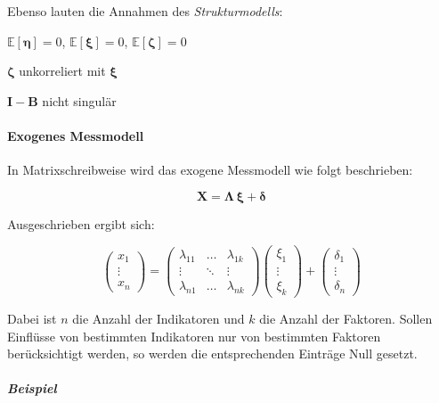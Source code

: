 \documentclass{article}
\numberwithin{equation}{section}
\begin{document}
Ebenso lauten die Annahmen des \emph{Strukturmodells}:

\begin{compactitem}
\item $\mathbb{E} [\boldsymbol\eta] = 0$, $\mathbb{E} [\boldsymbol\xi] = 0$, $\mathbb{E} [\boldsymbol\zeta] = 0$
\item $\boldsymbol\zeta$ unkorreliert mit $\boldsymbol\xi$
\item $\mathbf{I}-\mathbf{B}$ nicht singulär
\end{compactitem}

\paragraph*{Exogenes Messmodell}

In Matrixschreibweise wird das exogene Messmodell wie folgt beschrieben:

\begin{equation}
\mathbf{X} = \boldsymbol{\Lambda \, \xi} + \boldsymbol\delta
\end{equation}

Ausgeschrieben ergibt sich:

\begin{equation}
\begin{pmatrix}x_1\\ \vdots\\ x_n\end{pmatrix} = 
\begin{pmatrix}\lambda_{11} & \hdots & \lambda_{1k}\\ \vdots & \ddots & \vdots \\ \lambda_{n1} & \hdots & \lambda_{nk} \end{pmatrix}
\begin{pmatrix}\xi_1\\ \vdots\\ \xi_k\end{pmatrix} +
\begin{pmatrix}\delta_1\\ \vdots\\ \delta_n\end{pmatrix}
\end{equation}

Dabei ist $n$ die Anzahl der Indikatoren und $k$ die Anzahl der Faktoren. Sollen Einflüsse von bestimmten Indikatoren nur von bestimmten Faktoren berücksichtigt werden, so werden die entsprechenden Einträge Null gesetzt.

\subparagraph{Beispiel}
\end{document}
